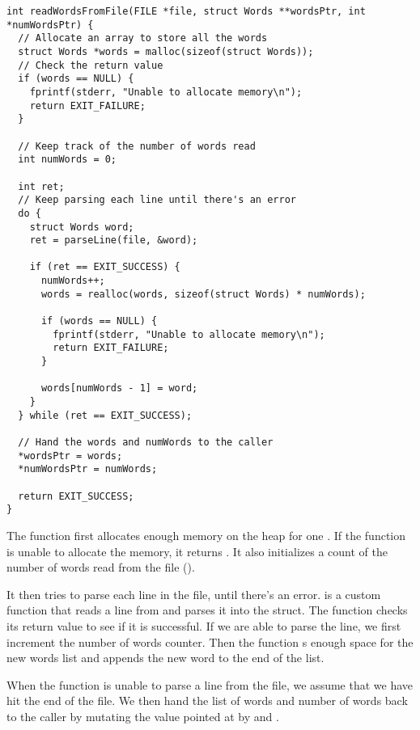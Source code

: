 \documentclass{article}
\theoremstyle{mytheoremstyle}
\theoremstyle{mytheoremstyle}
\theoremstyle{myproblemstyle}
\begin{document}
    \begin{lstlisting}
int readWordsFromFile(FILE *file, struct Words **wordsPtr, int *numWordsPtr) {
  // Allocate an array to store all the words
  struct Words *words = malloc(sizeof(struct Words));
  // Check the return value
  if (words == NULL) {
    fprintf(stderr, "Unable to allocate memory\n");
    return EXIT_FAILURE;
  }

  // Keep track of the number of words read
  int numWords = 0;

  int ret;
  // Keep parsing each line until there's an error
  do {
    struct Words word;
    ret = parseLine(file, &word);

    if (ret == EXIT_SUCCESS) {
      numWords++;
      words = realloc(words, sizeof(struct Words) * numWords);

      if (words == NULL) {
        fprintf(stderr, "Unable to allocate memory\n");
        return EXIT_FAILURE;
      }

      words[numWords - 1] = word;
    }
  } while (ret == EXIT_SUCCESS);

  // Hand the words and numWords to the caller
  *wordsPtr = words;
  *numWordsPtr = numWords;

  return EXIT_SUCCESS;
}
    \end{lstlisting}

    The function first allocates enough memory on the heap for one . If the function is unable to allocate the memory, it returns . It also initializes a count of the number of words read from the file ().

    It then tries to parse each line in the file, until there's an error.  is a custom function that reads a line from  and parses it into the  struct. The function checks its return value to see if it is successful. If we are able to parse the line, we first increment the number of words counter. Then the function s enough space for the new words list and appends the new word to the end of the list.
    
    When the function is unable to parse a line from the file, we assume that we have hit the end of the file. We then hand the list of words and number of words back to the caller by mutating the value pointed at by  and .

    \subsubsection{}
\end{document}
